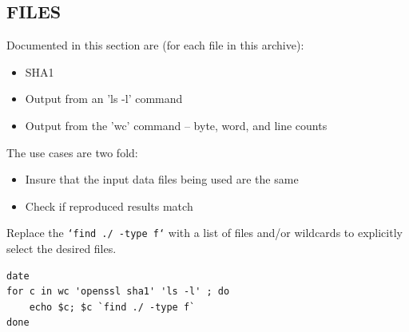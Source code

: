 \documentclass[11pt]{article}
\begin{document}
\subsection{FILES}
\label{sec:org6e96c64}

Documented in this section are (for each file in this archive):

\begin{itemize}
\item SHA1
\item Output from an 'ls -l' command
\item Output from the 'wc' command -- byte, word, and line counts
\end{itemize}

The use cases are two fold:

\begin{itemize}
\item Insure that the input data files being used are the same
\item Check if reproduced results match
\end{itemize}

Replace the \texttt{`find ./ -type f`} with a list of files and/or wildcards to explicitly select the desired files.

\begin{verbatim}
date
for c in wc 'openssl sha1' 'ls -l' ; do
    echo $c; $c `find ./ -type f`
done
\end{verbatim}
\end{document}
